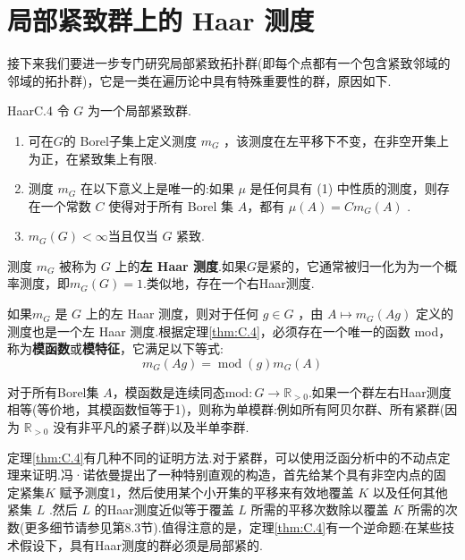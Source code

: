 \documentclass[lang=cn,a4paper,11pt,openany,scheme=chinese]{elegantbook}
\makeatletter
\newcommand{\bluebf}[1]{\textcolor{structurecolor}{\textbf{#1}}}
\newcommand\setboxcounter[2]{\setcounter{tcb@cnt@#1}{#2}}
\makeatother
\begin{document}
\section{局部紧致群上的 Haar 测度}

接下来我们要进一步专门研究局部紧致拓扑群(即每个点都有一个包含紧致邻域的邻域的拓扑群)，它是一类在遍历论中具有特殊重要性的群，原因如下.
\setboxcounter{theorem}{3}
\begin{theorem}{Haar}{C.4}
    令 \(G\) 为一个局部紧致群.
    \begin{enumerate}
        \item 可在\(G\)的 Borel子集上定义测度 \({m}_{G}\) ，该测度在左平移下不变，在非空开集上为正，在紧致集上有限.
        \item 测度 \({m}_{G}\) 在以下意义上是唯一的:如果 \(\mu\) 是任何具有 (1) 中性质的测度，则存在一个常数 \(C\) 使得对于所有 Borel 集 $A$，都有 \(\mu \left( A\right)  = C{m}_{G}\left( A\right)\) .
        \item \({m}_{G}\left( G\right)  < \infty\)当且仅当 \(G\) 紧致.
    \end{enumerate}
\end{theorem}
测度 \({m}_{G}\) 被称为 \(G\) 上的\bluebf{左 Haar 测度}.如果\(G\)是紧的，它通常被归一化为为一个概率测度，即\({m}_{G}\left( G\right)  = 1\).类似地，存在一个右Haar测度.\par
如果\({m}_{G}\) 是 \(G\) 上的左 Haar 测度，则对于任何 \(g \in  G\) ，由 \(A \mapsto  {m}_{G}\left( {Ag}\right)\) 定义的测度也是一个左 Haar 测度.根据定理\ref{thm:C.4}，必须存在一个唯一的函数 mod，称为\bluebf{模函数}或\bluebf{模特征}，它满足以下等式:
\[
{m}_{G}\left( {Ag}\right)  = {\operatorname{mod}\left(g\right) }{m}_{G}\left( A\right)
\]

对于所有Borel集 \(A\)，模函数是连续同态\(\mathrm{mod}:G \rightarrow  {\mathbb{R}}_{ > 0}\).如果一个群左右Haar测度相等(等价地，其模函数恒等于1)，则称为单模群:例如所有阿贝尔群、所有紧群(因为 \({\mathbb{R}}_{ > 0}\) 没有非平凡的紧子群)以及半单李群.

定理\ref{thm:C.4}有几种不同的证明方法.对于紧群，可以使用泛函分析中的不动点定理来证明.冯·诺依曼提出了一种特别直观的构造，首先给某个具有非空内点的固定紧集\(K\) 赋予测度1，然后使用某个小开集的平移来有效地覆盖 \(K\) 以及任何其他紧集 \(L\) .然后 \(L\) 的Haar测度近似等于覆盖 \(L\) 所需的平移次数除以覆盖 \(K\) 所需的次数(更多细节请参见第8.3节).值得注意的是，定理\ref{thm:C.4}有一个逆命题:在某些技术假设下，具有Haar测度的群必须是局部紧的.
\end{document}
